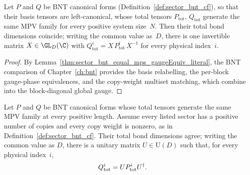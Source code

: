 \begin{theorem}%
    \label{thm:cpgsv_equal_case_left_canonical}
    \leanok
    Let $P$ and $Q$ be BNT canonical forms (Definition~\ref{def:sector_bnt_cf}),
    so that their basis tensors are left-canonical, whose total tensors
    $P_{\mathrm{tot}}$, $Q_{\mathrm{tot}}$ generate the same MPV family for
    every positive system size~$N$. Then their total bond dimensions coincide;
    writing the common value as~$D$, there is one invertible matrix
    $X\in\GL_D(\C)$ with $Q_{\mathrm{tot}}^i=X\,P_{\mathrm{tot}}^i\,X^{-1}$ for
    every physical index~$i$.
\end{theorem}

\begin{proof}\leanok
    By Lemma~\ref{thm:sector_bnt_equal_mps_gaugeEquiv_literal}, the BNT
    comparison of Chapter~\ref{ch:bnt} provides the basis relabelling, the
    per-block gauge-phase equivalences, and the copy-weight multiset matching,
    which combine into the block-diagonal global gauge.
\end{proof}

\begin{corollary}%
    \label{cor:sector_bnt_equal_unitary_global_gauge}
    \leanok
    Let $P$ and $Q$ be BNT canonical forms whose total tensors generate the
    same MPV family at every positive length. Assume every listed sector has a
    positive number of copies and every copy weight is nonzero, as in
    Definition~\ref{def:sector_bnt_cf}. Their total bond dimensions
    agree; writing the common value as $D$, there is a unitary matrix
    $U\in\mathrm{U}(D)$ such that, for every physical index~$i$,
    \begin{align}
        Q_{\mathrm{tot}}^i
         & = U P_{\mathrm{tot}}^i U^\dagger.
        \notag
    \end{align}
\end{corollary}

